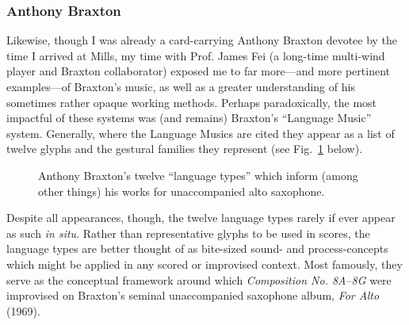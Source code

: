     \subsubsection{Anthony Braxton}
    Likewise, though I was already a card-carrying Anthony Braxton devotee by the time I arrived at Mills, my time with Prof. James Fei (a long-time multi-wind player and Braxton collaborator) exposed me to far more---and more pertinent examples---of Braxton's music, as well as a greater understanding of his sometimes rather opaque working methods. Perhaps paradoxically, the most impactful of these systems was (and remains) Braxton's ``Language Music'' system. Generally, where the Language Musics are cited they appear as a list of twelve glyphs and the gestural families they represent (see Fig.~\ref{fig:language_types} below). 

    \begin{figure}
        \centering
        \captionsetup{width=.45\textwidth}
        \caption[Anthony Braxton's twelve ``language types'' which inform (among other things) his works for unaccompanied alto saxophone.]{Anthony Braxton's twelve ``language types'' which inform (among other things) his works for unaccompanied alto saxophone.\footnotemark}
        \label{fig:language_types}
    \end{figure}

    \noindent Despite all appearances, though, the twelve language types rarely if ever appear as such \textit{in situ}. Rather than representative glyphs to be used in scores, the language types are better thought of as bite-sized sound- and process-concepts which might be applied in any scored or improvised context. Most famously, they serve as the conceptual framework around which \textit{Composition No. 8A}--\textit{8G} were improvised on Braxton's seminal unaccompanied saxophone album, \textit{For Alto} (1969).\autocite[118--49]{Braxton_1988A} 
    
